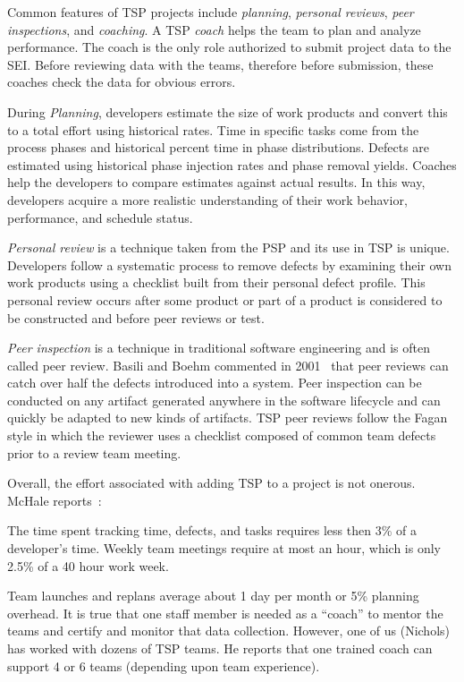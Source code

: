 Common features of TSP projects include {\em planning}, {\em personal reviews}, {\em peer inspections}, and {\em coaching}.
A TSP {\em coach} helps the team to plan and analyze performance. The coach is the only role authorized to submit project data to the SEI.
Before reviewing data with the teams, therefore before submission, these coaches check the data for obvious errors.

During {\em Planning}, developers estimate the size of work products and convert this to a total effort using historical rates. Time in specific tasks come from the  process phases and historical percent time in phase distributions. Defects are estimated using historical phase injection rates and phase removal yields. Coaches help the developers to compare estimates against actual results. In this way, developers acquire a more realistic understanding of their work behavior, performance, and schedule status.

{\em Personal review} is a technique taken from the PSP and its use in TSP is unique.  Developers follow a systematic process to remove defects by  examining their own work products using a checklist built from their personal defect profile. This personal review occurs after some product or part of a product is considered to be constructed and before peer reviews or test. 

  
 
{\em Peer inspection} is a  technique in
traditional software engineering and is often called peer review.
 Basili and Boehm   commented in 2001~\cite{boehm01} 
that peer reviews can catch over half the defects introduced into a system.
Peer inspection can be conducted on any artifact generated anywhere in the software
lifecycle and can quickly be adapted to new kinds of artifacts. TSP peer reviews follow the Fagan style in which the reviewer uses a checklist composed of common team defects prior to a review team meeting. 
 
Overall, the   effort associated with adding TSP to a project is not onerous. McHale reports~\cite{mchale02}:
\bi
\item
 The time spent  tracking time, defects, and tasks requires less then 3\% of a developer's time. Weekly team meetings  require at most an hour, which is
only 2.5\% of a 40 hour work week. 
\item
Team launches and replans average about 1 day per month or 5\% planning overhead.
\ei
It is true that one staff member is needed as a ``coach'' to mentor the teams
and certify and monitor that data collection. However, one of us (Nichols) has worked with dozens of TSP teams. He reports that one  trained coach can support 4 or 6 teams (depending upon team experience).
 
